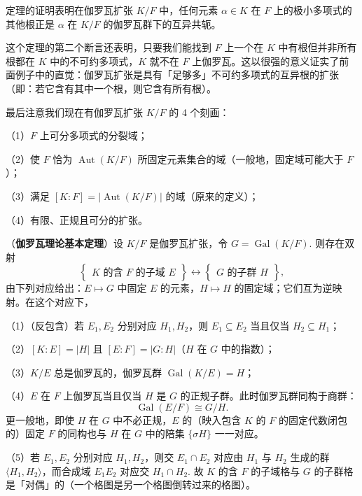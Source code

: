 定理的证明表明在伽罗瓦扩张 \(K/F\) 中，任何元素 \(\alpha \in K\) 在 \(F\) 上的极小多项式的其他根正是 \(\alpha\) 在 \(K/F\) 的伽罗瓦群下的互异共轭。

这个定理的第二个断言还表明，只要我们能找到 \(F\) 上一个在 \(K\) 中有根但并非所有根都在 \(K\) 中的不可约多项式，\(K\) 就不在 \(F\) 上伽罗瓦。这以很强的意义证实了前面例子中的直觉：伽罗瓦扩张是具有「足够多」不可约多项式的互异根的扩张（即：若它含有其中一个根，则它含有所有根）。

最后注意我们现在有伽罗瓦扩张 \(K/F\) 的 4 个刻画：

（1）\(F\) 上可分多项式的分裂域；

（2）使 \(F\) 恰为 \(\operatorname{Aut}(K/F)\) 所固定元素集合的域（一般地，固定域可能大于 \(F\)）；

（3）满足 \([K:F] = |\operatorname{Aut}(K/F)|\) 的域（原来的定义）；

（4）有限、正规且可分的扩张。

\begin{theorem}\label{thm:14.14}
（\textbf{伽罗瓦理论基本定理}）设 \(K/F\) 是伽罗瓦扩张，令 \(G = \operatorname{Gal}(K/F)\). 则存在双射
\[
\left\{\begin{array}{c} K \text{ 的含 } F \text{ 的子域 } E\end{array}\right\} \longleftrightarrow \left\{\begin{array}{c} G \text{ 的子群 } H\end{array}\right\},
\]
由下列对应给出：\(E \mapsto G\) 中固定 \(E\) 的元素，\(H \mapsto H\) 的固定域；它们互为逆映射。在这个对应下，

（1）（反包含）若 \(E_1, E_2\) 分别对应 \(H_1, H_2\)，则 \(E_1 \subseteq E_2\) 当且仅当 \(H_2 \subseteq H_1\)；

（2）\([K:E] = |H|\) 且 \([E:F] = |G:H|\)（\(H\) 在 \(G\) 中的指数）；

（3）\(K/E\) 总是伽罗瓦的，伽罗瓦群 \(\operatorname{Gal}(K/E) = H\)；

（4）\(E\) 在 \(F\) 上伽罗瓦当且仅当 \(H\) 是 \(G\) 的正规子群。此时伽罗瓦群同构于商群：
\[
\operatorname{Gal}(E/F) \cong G/H.
\]
更一般地，即使 \(H\) 在 \(G\) 中不必正规，\(E\) 的（映入包含 \(K\) 的 \(F\) 的固定代数闭包的）固定 \(F\) 的同构也与 \(H\) 在 \(G\) 中的陪集 \(\{\sigma H\}\) 一一对应。

（5）若 \(E_1, E_2\) 分别对应 \(H_1, H_2\)，则交 \(E_1 \cap E_2\) 对应由 \(H_1\) 与 \(H_2\) 生成的群 \(\langle H_1, H_2 \rangle\)，而合成域 \(E_1E_2\) 对应交 \(H_1 \cap H_2\). 故 \(K\) 的含 \(F\) 的子域格与 \(G\) 的子群格是「对偶」的（一个格图是另一个格图倒转过来的格图）。
\end{theorem}


